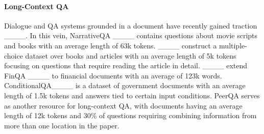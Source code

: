 \paragraph{Long-Context QA} Dialogue and QA systems grounded in a document have recently gained traction ____. 
In this vein, NarrativeQA ____ contains questions about movie scripts and books with an average length of 63k tokens. ____ construct a multiple-choice dataset over books and articles with an average length of 5k tokens focusing on questions that require reading the article in detail. ____ extend FinQA ____ to financial documents with an average of 123k words. ConditionalQA____ is a dataset of government documents with an average length of 1.5k tokens and answers tied to certain input conditions. PeerQA serves as another resource for long-context QA, with documents having an average length of 12k tokens and 30\% of questions requiring combining information from more than one location in the paper.